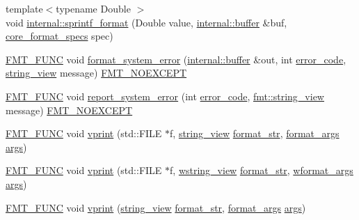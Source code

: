 \begin{DoxyCompactItemize}
\item 
{\footnotesize template$<$typename Double $>$ }\\void \hyperlink{namespaceinternal_a13d861df4fe01615dc7cb28d77e839e4}{internal\+::sprintf\+\_\+format} (Double value, \hyperlink{namespaceinternal_a5fcdbc3efad1f390e6c3f0fdafa56122}{internal\+::buffer} \&buf, \hyperlink{structcore__format__specs}{core\+\_\+format\+\_\+specs} spec)
\item 
\hyperlink{format_8h_a02c8898388e0ae59aab58be14fcd4e05}{F\+M\+T\+\_\+\+F\+U\+NC} void \hyperlink{format-inl_8h_a4826487444d21827180f5fbce3c64508}{format\+\_\+system\+\_\+error} (\hyperlink{namespaceinternal_a5fcdbc3efad1f390e6c3f0fdafa56122}{internal\+::buffer} \&out, int \hyperlink{classerror__code}{error\+\_\+code}, \hyperlink{core_8h_a17e3ff7f9ac2b8f068f719b829890036}{string\+\_\+view} message) \hyperlink{core_8h_aef128913e8400683b1cbd1a3a2e11df3}{F\+M\+T\+\_\+\+N\+O\+E\+X\+C\+E\+PT}
\item 
\hyperlink{format_8h_a02c8898388e0ae59aab58be14fcd4e05}{F\+M\+T\+\_\+\+F\+U\+NC} void \hyperlink{format-inl_8h_a82b610312f3005c8480b1d8439b129be}{report\+\_\+system\+\_\+error} (int \hyperlink{classerror__code}{error\+\_\+code}, \hyperlink{core_8h_a17e3ff7f9ac2b8f068f719b829890036}{fmt\+::string\+\_\+view} message) \hyperlink{core_8h_aef128913e8400683b1cbd1a3a2e11df3}{F\+M\+T\+\_\+\+N\+O\+E\+X\+C\+E\+PT}
\item 
\hyperlink{format_8h_a02c8898388e0ae59aab58be14fcd4e05}{F\+M\+T\+\_\+\+F\+U\+NC} void \hyperlink{format-inl_8h_a9d834f6ef5c0553b6c434f8d9ac105bf}{vprint} (std\+::\+F\+I\+LE $\ast$f, \hyperlink{core_8h_a17e3ff7f9ac2b8f068f719b829890036}{string\+\_\+view} \hyperlink{format_8h_aa2b402011ee0619f2158f13e0827e585}{format\+\_\+str}, \hyperlink{structformat__args}{format\+\_\+args} \hyperlink{printf_8h_a47047b7b28fd1342eef756b79c778580}{args})
\item 
\hyperlink{format_8h_a02c8898388e0ae59aab58be14fcd4e05}{F\+M\+T\+\_\+\+F\+U\+NC} void \hyperlink{format-inl_8h_a263a1a720ae8f902535a6c7a4933841e}{vprint} (std\+::\+F\+I\+LE $\ast$f, \hyperlink{core_8h_ad7c259380697a46ef799332f3ded429e}{wstring\+\_\+view} \hyperlink{format_8h_aa2b402011ee0619f2158f13e0827e585}{format\+\_\+str}, \hyperlink{structwformat__args}{wformat\+\_\+args} \hyperlink{printf_8h_a47047b7b28fd1342eef756b79c778580}{args})
\item 
\hyperlink{format_8h_a02c8898388e0ae59aab58be14fcd4e05}{F\+M\+T\+\_\+\+F\+U\+NC} void \hyperlink{format-inl_8h_a77fcf4959d4c69c3800b759696f37248}{vprint} (\hyperlink{core_8h_a17e3ff7f9ac2b8f068f719b829890036}{string\+\_\+view} \hyperlink{format_8h_aa2b402011ee0619f2158f13e0827e585}{format\+\_\+str}, \hyperlink{structformat__args}{format\+\_\+args} \hyperlink{printf_8h_a47047b7b28fd1342eef756b79c778580}{args})

\end{DoxyCompactItemize}
